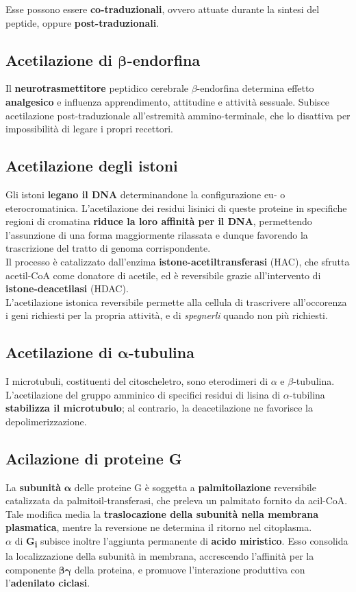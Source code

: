 \documentclass[a4paper, 12pt]{article}
\begin{document}
Esse possono essere \textbf{co-traduzionali}, ovvero attuate durante la sintesi del peptide, oppure \textbf{post-traduzionali}.

\subsection{Acetilazione di $\boldsymbol\beta$-endorfina}
Il \textbf{neurotrasmettitore} peptidico cerebrale $\beta$-endorfina determina effetto \textbf{analgesico} e influenza apprendimento, attitudine e attività sessuale. Subisce acetilazione post-traduzionale all'estremità ammino-terminale, che lo disattiva per impossibilità di legare i propri recettori.

\subsection{Acetilazione degli istoni}
Gli istoni \textbf{legano il DNA} determinandone la configurazione eu- o eterocromatinica. L'acetilazione dei residui lisinici di queste proteine in specifiche regioni di cromatina \textbf{riduce la loro affinità per il DNA}, permettendo l'assunzione di una forma maggiormente rilassata e dunque favorendo la trascrizione del tratto di genoma corrispondente.\\
Il processo è catalizzato dall'enzima \textbf{istone-acetiltransferasi} (HAC), che sfrutta acetil-CoA come donatore di acetile, ed è reversibile grazie all'intervento di \textbf{istone-deacetilasi} (HDAC).\\
L'acetilazione istonica reversibile permette alla cellula di trascrivere all'occorenza i geni richiesti per la propria attività, e di \textit{spegnerli} quando non più richiesti.

\subsection{Acetilazione di $\boldsymbol\alpha$-tubulina}
I microtubuli, costituenti del citoscheletro, sono eterodimeri di $\alpha$ e $\beta$-tubulina.\\
L'acetilazione del gruppo amminico di specifici residui di lisina di $\alpha$-tubilina \textbf{stabilizza il microtubulo}; al contrario, la deacetilazione ne favorisce la depolimerizzazione.

\subsection{Acilazione di proteine G}
La \textbf{subunità} $\boldsymbol\alpha$ delle proteine G è soggetta a \textbf{palmitoilazione} reversibile catalizzata da palmitoil-transferasi, che preleva un palmitato fornito da acil-CoA. Tale modifica media la \textbf{traslocazione della subunità nella membrana plasmatica}, mentre la reversione ne determina il ritorno nel citoplasma.\\
$\alpha$ di \textbf{G\textsubscript{i}} subisce inoltre l'aggiunta permanente di \textbf{acido miristico}. Esso consolida la localizzazione della subunità in membrana, accrescendo l'affinità per la componente $\boldsymbol{\beta\gamma}$ della proteina, e promuove l'interazione produttiva con l'\textbf{adenilato ciclasi}.
\end{document}
